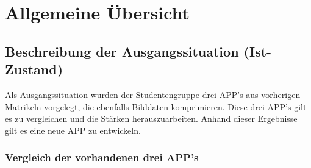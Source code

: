 %
%	


\section{Allgemeine Übersicht}

\subsection{\textbf{Beschreibung der Ausgangssituation (Ist-Zustand) }}

Als Ausgangssituation wurden der Studentengruppe drei \acs{APP}'s aus vorherigen Matrikeln vorgelegt, die ebenfalls Bilddaten komprimieren. Diese drei \acs{APP}'s gilt es zu vergleichen und die Stärken herauszuarbeiten. Anhand dieser Ergebnisse gilt es eine neue \acs{APP} zu entwickeln.


\subsubsection{Vergleich der vorhandenen drei \acs{APP}'s}
\begin{landscape}
%
%
%
%
%
%
%

\newpage



\end{landscape}

